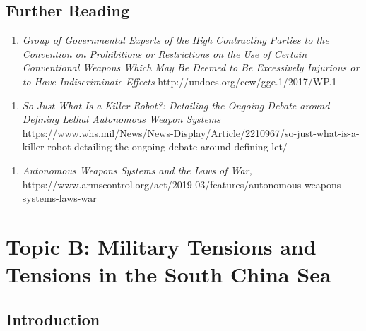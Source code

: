\documentclass[10pt, letterpaper]{article}
\begin{document}
\subsection{Further Reading}

\begin{enumerate}
\def\labelenumi{\arabic{enumi}.}
\item
  \emph{Group of Governmental Experts of the High Contracting Parties to
  the Convention on Prohibitions or Restrictions on the Use of Certain
  Conventional Weapons Which May Be Deemed to Be Excessively Injurious
  or to Have Indiscriminate Effects} http://undocs.org/ccw/gge.1/2017/WP.1
\end{enumerate}


\begin{enumerate}
\def\labelenumi{\arabic{enumi}.}
\setcounter{enumi}{1}
\item
  \emph{So Just What Is a Killer Robot?: Detailing the Ongoing Debate
  around Defining Lethal Autonomous Weapon Systems} https://www.whs.mil/News/News-Display/Article/2210967/so-just-what-is-a-killer-robot-detailing-the-ongoing-debate-around-defining-let/
\end{enumerate}



\begin{enumerate}
\def\labelenumi{\arabic{enumi}.}
\setcounter{enumi}{2}
\item
  \emph{Autonomous Weapons Systems and the Laws of War,}\\ https://www.armscontrol.org/act/2019-03/features/autonomous-weapons-systems-laws-war

\end{enumerate}


\newpage
\section{Topic B: Military Tensions and Tensions in the South China
Sea}

\subsection{Introduction}
\end{document}
